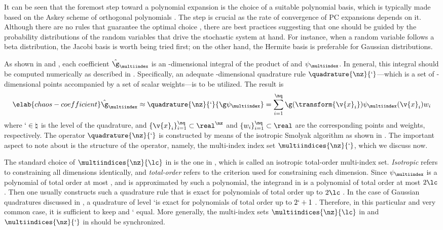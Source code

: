 It can be seen that the foremost step toward a polynomial expansion is the
choice of a suitable polynomial basis, which is typically made based on the
Askey scheme of orthogonal polynomials \cite{xiu2010}. The step is crucial as
the rate of convergence of \ac{PC} expansions depends on it. Although there are
no rules that guarantee the optimal choice \cite{knio2006}, there are best
practices suggesting that one should be guided by the probability distributions
of the random variables that drive the stochastic system at hand. For instance,
when a random variable follows a beta distribution, the Jacobi basis is worth
being tried first; on the other hand, the Hermite basis is preferable for
Gaussian distributions.

As shown in  and , each
coefficient $\hat{\g}_{\multiindex}$ is an \nz-dimensional integral of the
product of \g and $\psi_{\multiindex}$. In general, this integral should be
computed numerically as described in . Specifically,
an adequate \nz-dimensional quadrature rule $\quadrature{\nz}{\lq}$---which is a
set of \nz-dimensional points accompanied by a set of scalar weights---is to be
utilized. The result is
\begin{equation} \elab{chaos-coefficient}
  \hat{\g}_{\multiindex} \approx \quadrature{\nz}{\lq}{\g \psi_{\multiindex}} = \sum_{i = 1}^\nq \g(\transform{\v{x}_i}) \psi_{\multiindex}(\v{x}_i) w_i
\end{equation}
where $\lq \in \natural$ is the level of the quadrature, and $\{ \v{x}_i \}_{i =
1}^\nq \subset \real^\nz$ and $\{ w_i \}_{i = 1}^\nq \subset \real$ are the
corresponding points and weights, respectively. The operator
$\quadrature{\nz}{\lq}$ is constructed by means of the isotropic Smolyak
algorithm \cite{smolyak1963} as shown in . The
important aspect to note about  is the structure of
the operator, namely, the multi-index index set $\multiindices{\nz}{\lq}$, which
we discuss now.

The standard choice of $\multiindices{\nz}{\lc}$ in  is
the one in , which is called an isotropic
total-order multi-index set. \emph{Isotropic} refers to constraining all
dimensions identically, and \emph{total-order} refers to the criterion used for
constraining each dimension. Since $\psi_{\multiindex}$ is a polynomial of total
order at most \lc, and \g is approximated by such a polynomial, the integrand in
 is a polynomial of total order at most $2 \lc$. Then
one usually constructs such a quadrature rule that is exact for polynomials of
total order up to $2 \lc$ \cite{eldred2008}. In the case of Gaussian quadratures
discussed in , a quadrature of level \lq is exact
for polynomials of total order up to $2 \lq + 1$ \cite{heiss2008}. Therefore, in
this particular and very common case, it is sufficient to keep \lc and \lq
equal. More generally, the multi-index sets $\multiindices{\nz}{\lc}$ in
 and $\multiindices{\nz}{\lq}$ in 
should be synchronized.

